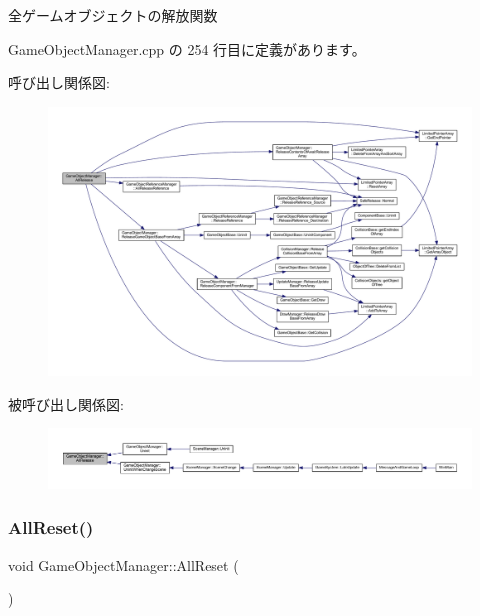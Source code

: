 全ゲームオブジェクトの解放関数 



 Game\+Object\+Manager.\+cpp の 254 行目に定義があります。

呼び出し関係図\+:\nopagebreak
\begin{figure}[H]
\begin{center}
\leavevmode
\includegraphics[width=350pt]{class_game_object_manager_a58e1266da3b18a4c0bded551e386c6ae_cgraph}
\end{center}
\end{figure}
被呼び出し関係図\+:
\nopagebreak
\begin{figure}[H]
\begin{center}
\leavevmode
\includegraphics[width=350pt]{class_game_object_manager_a58e1266da3b18a4c0bded551e386c6ae_icgraph}
\end{center}
\end{figure}
\mbox{\label{class_game_object_manager_a38f980aec0970f45eb9bc55db8ac01a3}} 
\subsubsection{\texorpdfstring{All\+Reset()}{AllReset()}}
{\footnotesize\ttfamily void Game\+Object\+Manager\+::\+All\+Reset (\begin{DoxyParamCaption}{ }\end{DoxyParamCaption})\hspace{0.3cm}{\ttfamily [static]}}



